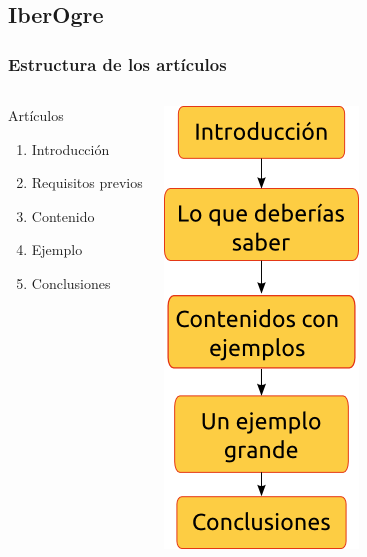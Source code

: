 \documentclass[green]{beamer}
\begin{document}
\subsection{IberOgre}

\begin{frame}
    \frametitle{Estructura de los artículos}
    
    \begin{columns}[t]
    \column{150pt}
        
	\begin{block}{Artículos}
            \begin{enumerate}
                \item Introducción
		\item Requisitos previos
		\item Contenido
		\item Ejemplo
		\item Conclusiones
            \end{enumerate}            
        \end{block}
	
    \column{150pt}
        
	\begin{center}
	    \includegraphics[scale=0.40]{img/estructura-articulos.png}
	\end{center}
	
    \end{columns} 
    
\end{frame}
\end{document}
